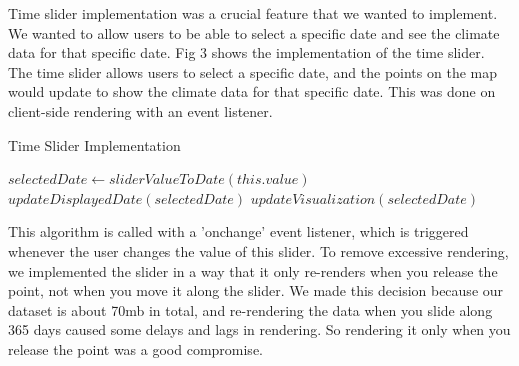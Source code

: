 \documentclass[9pt,twocolumn,twoside]{opticajnl}
\begin{document}
Time slider implementation was a crucial feature that we wanted to implement. We wanted to allow users to be able to select a specific date and see the climate data for that specific date. Fig 3 shows the implementation of the time slider. The time slider allows users to select a specific date, and the points on the map would update to show the climate data for that specific date. This was done on client-side rendering with an event listener.

\begin{algorithm}
    \caption{Time Slider Implementation}
    \begin{algorithmic}[1]
    \State $selectedDate \gets sliderValueToDate(this.value)$
    \State $updateDisplayedDate(selectedDate)$
    \State $updateVisualization(selectedDate)$
    \EndProcedure
    \end{algorithmic}
\end{algorithm}

This algorithm is called with a 'onchange' event listener, which is triggered whenever the user changes the value of this slider. To remove excessive rendering, we implemented the slider in a way that it only re-renders when you release the point, not when you move it along the slider. We made this decision because our dataset is about 70mb in total, and re-rendering the data when you slide along 365 days caused some delays and lags in rendering. So rendering it only when you release the point was a good compromise.
\end{document}
